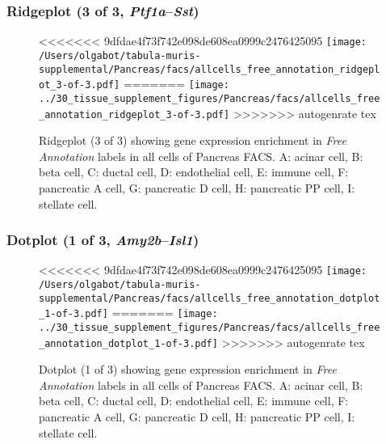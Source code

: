 \clearpage

\subsubsection{Ridgeplot (3 of 3, \emph{Ptf1a}--\emph{Sst})}
\begin{figure}[h]
\centering
<<<<<<< 9dfdae4f73f742e098de608ea0999c2476425095
\texttt{[image: /Users/olgabot/tabula-muris-supplemental/Pancreas/facs/allcells\_free\_annotation\_ridgeplot\_3-of-3.pdf]}
=======
\texttt{[image: ../30\_tissue\_supplement\_figures/Pancreas/facs/allcells\_free\_annotation\_ridgeplot\_3-of-3.pdf]}
>>>>>>> autogenrate tex

\caption{ Ridgeplot (3 of 3)  showing gene expression enrichment in \emph{Free Annotation} labels in all cells of Pancreas FACS. A: acinar cell, B: beta cell, C: ductal cell, D: endothelial cell, E: immune cell, F: pancreatic A cell, G: pancreatic D cell, H: pancreatic PP cell, I: stellate cell.}
\end{figure}


\clearpage

\subsubsection{Dotplot (1 of 3, \emph{Amy2b}--\emph{Isl1})}
\begin{figure}[h]
\centering
<<<<<<< 9dfdae4f73f742e098de608ea0999c2476425095
\texttt{[image: /Users/olgabot/tabula-muris-supplemental/Pancreas/facs/allcells\_free\_annotation\_dotplot\_1-of-3.pdf]}
=======
\texttt{[image: ../30\_tissue\_supplement\_figures/Pancreas/facs/allcells\_free\_annotation\_dotplot\_1-of-3.pdf]}
>>>>>>> autogenrate tex

\caption{ Dotplot (1 of 3)  showing gene expression enrichment in \emph{Free Annotation} labels in all cells of Pancreas FACS. A: acinar cell, B: beta cell, C: ductal cell, D: endothelial cell, E: immune cell, F: pancreatic A cell, G: pancreatic D cell, H: pancreatic PP cell, I: stellate cell.}
\end{figure}


\clearpage

